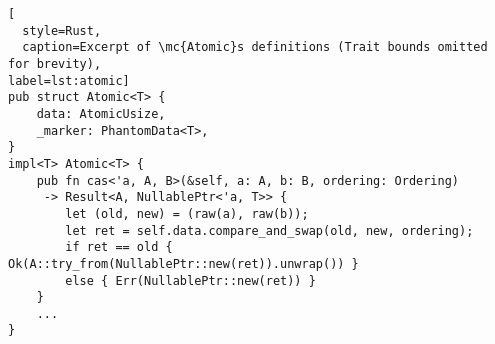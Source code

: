 \begin{lstlisting}[
  style=Rust,
  caption=Excerpt of \mc{Atomic}s definitions (Trait bounds omitted for brevity),
label=lst:atomic]
pub struct Atomic<T> {
    data: AtomicUsize,
    _marker: PhantomData<T>,
}
impl<T> Atomic<T> {
    pub fn cas<'a, A, B>(&self, a: A, b: B, ordering: Ordering)
     -> Result<A, NullablePtr<'a, T>> {
        let (old, new) = (raw(a), raw(b));
        let ret = self.data.compare_and_swap(old, new, ordering);
        if ret == old { Ok(A::try_from(NullablePtr::new(ret)).unwrap()) }
        else { Err(NullablePtr::new(ret)) }
    }
    ...
}

\end{lstlisting}
